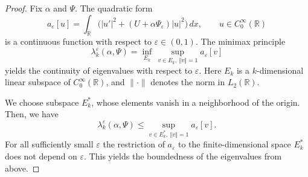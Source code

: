 \documentclass[11pt,english]{amsart}
\begin{document}
\begin{proof} Fix $\alpha$ and $\Psi$. The quadratic form
$$
a_{\varepsilon}[u]=\int_{\mathbb{R}}\bigl(|u'|^2+(U+\alpha\Psi_\varepsilon)|u|^2\bigr)\,dx,\qquad u\in C_0^\infty(\mathbb{R})
$$
is a continuous function with respect to $\varepsilon\in(0,1)$.
The minimax principle
$$
\lambda_k^\varepsilon(\alpha, \Psi)=\inf\limits_{E_k}\,\sup\limits_{v\in
E_k,\: {\left\Vert{v}\right\Vert}=1}a_{\varepsilon}[v]
$$
yields the continuity of eigenvalues  with respect to $\varepsilon$.
Here $E_k$ is a $k$-dimensional linear subspace of $C_0^\infty(\mathbb{R})$, and $\|\cdot\|$ denotes the norm in $L_2(\mathbb{R})$.

We choose subspace $E_k^*$, whose elements vanish in a neighborhood  of the origin.
Then, we have
\begin{equation}\label{InEqMinMax}
\lambda_k^\varepsilon(\alpha, \Psi)\leq\sup\limits_{v\in E_k^*,\:
{\left\Vert{v}\right\Vert}=1}a_{\varepsilon}[v].
\end{equation}
For all sufficiently small $\varepsilon$ the restriction of $a_{\varepsilon}$ to the finite-dimensional space $E_k^*$ does not depend on $\varepsilon$. This yields the boundedness of the eigenvalues from above.


\end{proof}
\end{document}

